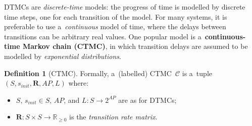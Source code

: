 \documentclass[a4paper, 11pt]{article}
\theoremstyle{definition}
\newtheorem{definition}{Definition}[section]
\begin{document}
DTMCs are \emph{discrete-time} models: the progress of time is modelled
by discrete time steps, one for each transition of the model. For many
systems, it is preferable to use a~\emph{continuous} model of time, where
the delays between transitions can be arbitrary real values. One popular
model is a~\textbf{continuous-time Markov chain (CTMC)}, in which
transition delays are assumed to be modelled by \emph{exponential
distributions}.

\begin{definition}[CTMC]
Formally, a~(labelled) CTMC~$ \mathcal{C} $ is a~tuple $ (S, s_{init},
\boldsymbol{R}, AP, L) $ where:
\begin{itemize}
    \item
        $ S $, $ s_{init} \in S $, $ AP $, and $ L : S \rightarrow
        2^{AP} $ are as for DTMCs;

    \item
        $ \boldsymbol{R} : S \times S \rightarrow \mathbb{R}_{\geq 0} $
        is the \emph{transition rate matrix}.
\end{itemize}
\end{definition}
\end{document}
